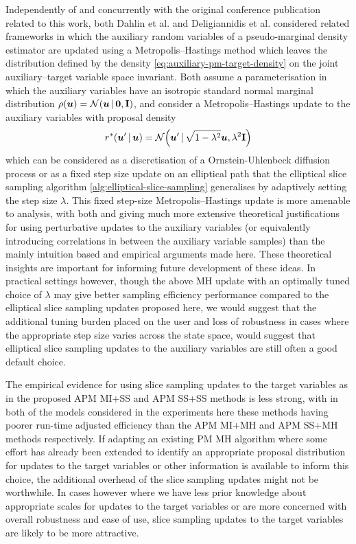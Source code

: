 Independently of and concurrently with the original conference publication \citep{murray2016pseudo} related to this work, both Dahlin et al. \citep{dahlin2015accelerating} and Deligiannidis et al. \citep{deligiannidis2015correlated} considered related frameworks in which the auxiliary random variables of a pseudo-marginal density estimator are updated using a Metropolis--Hastings method which leaves the distribution defined by the density \eqref{eq:auxiliary-pm-target-density} on the joint auxiliary--target variable space invariant. Both assume a parameterisation in which the auxiliary variables have an isotropic standard normal marginal distribution $\rho(\vct{u}) = \nrm{\vct{u} \gvn \vct{0},\mathbf{I}}$, and consider a Metropolis--Hastings update to the auxiliary variables with proposal density
\begin{equation}\label{eq:crank-nicholson-proposal}
  r^*(\vct{u}'\gvn\vct{u}) = 
  \nrm{\vct{u}' \gvn \sqrt{1 - \lambda^2} \vct{u}, \lambda^2 \mathbf{I}}
\end{equation}
which can be considered as a discretisation of a Ornstein-Uhlenbeck diffusion process or as a fixed step size update on an elliptical path that the elliptical slice sampling algorithm \ref{alg:elliptical-slice-sampling} generalises by adaptively setting the step size $\lambda$. This fixed step-size Metropolis--Hastings update is more amenable to analysis, with both \citep{dahlin2015accelerating} and \citep{deligiannidis2015correlated} giving much more extensive theoretical justifications for using perturbative updates to the auxiliary variables (or equivalently introducing correlations in between the auxiliary variable samples) than the mainly intuition based and empirical arguments made here. These theoretical insights are important for informing future development of these ideas. In practical settings however, though the above \ac{MH} update with an optimally tuned choice of $\lambda$ may give better sampling efficiency performance compared to the elliptical slice sampling updates proposed here, we would suggest that the additional tuning burden placed on the user and loss of robustness in cases where the appropriate step size varies across the state space, would suggest that elliptical slice sampling updates to the auxiliary variables are still often a good default choice.

The empirical evidence for using slice sampling updates to the target variables as in the proposed \ac{APM} \ac{MI}+\ac{SS} and \ac{APM} \ac{SS}+\ac{SS} methods is less strong, with in both of the models considered in the experiments here these methods having poorer run-time adjusted efficiency than the \ac{APM} \ac{MI}+\ac{MH} and \ac{APM} \ac{SS}+\ac{MH} methods respectively. If adapting an existing \ac{PM} \ac{MH} algorithm where some effort has already been extended to identify an appropriate proposal distribution for updates to the target variables or other information is available to inform this choice, the additional overhead of the slice sampling updates might not be worthwhile. In cases however where we have less prior knowledge about appropriate scales for updates to the target variables or are more concerned with overall robustness and ease of use, slice sampling updates to the target variables are likely to be more attractive.

